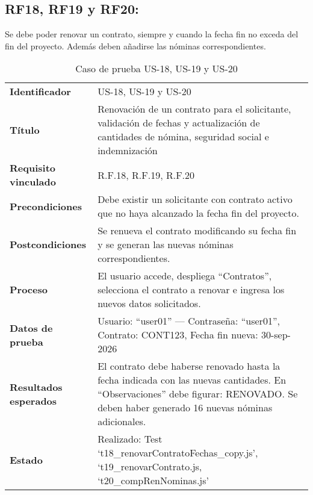 \subsection*{RF18, RF19 y RF20:} Se debe poder renovar un contrato, siempre y cuando la fecha fin no exceda del fin del proyecto. Además deben añadirse las nóminas correspondientes.
\begin{table}[H]
	\centering
	\small
	\caption{Caso de prueba US-18, US-19 y US-20}
	\label{tab:caso_uso18}
	\begin{tabular}{>{\bfseries}l p{11cm}}
		Identificador & US-18, US-19 y US-20 \\
		Título & Renovación de un contrato para el solicitante, validación de fechas y actualización de cantidades de nómina, seguridad social e indemnización \\
		Requisito vinculado & R.F.18, R.F.19, R.F.20 \\
		Precondiciones & Debe existir un solicitante con contrato activo que no haya alcanzado la fecha fin del proyecto. \\
		Postcondiciones & Se renueva el contrato modificando su fecha fin y se generan las nuevas nóminas correspondientes. \\
		Proceso & El usuario accede, despliega “Contratos”, selecciona el contrato a renovar e ingresa los nuevos datos solicitados. \\
		Datos de prueba & Usuario: “user01” — Contraseña: “user01”, Contrato: CONT123, Fecha fin nueva: 30-sep-2026 \\
		Resultados esperados & El contrato debe haberse renovado hasta la fecha indicada con las nuevas cantidades. En “Observaciones” debe figurar: RENOVADO. Se deben haber generado 16 nuevas nóminas adicionales. \\
		Estado & Realizado: Test `t18\_renovarContratoFechas\_copy.js', `t19\_renovarContrato.js, `t20\_compRenNominas.js' \\
	\end{tabular}
\end{table}



